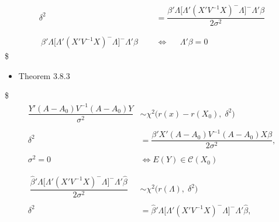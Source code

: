 \documentclass[
]{book}
\providecommand{\tightlist}{%
  \setlength{\itemsep}{0pt}\setlength{\parskip}{0pt}}
\begin{document}
{{{\begin{align}
\\
\\

\delta^2 &= \dfrac{\beta ' \Lambda \Big[ \Lambda ' (X'V^{-1}X)^- \Lambda \Big]^- \Lambda ' \beta}{2\sigma^2} \tag{1}


\\

\\

\\\


{\beta ' \Lambda \Big[ \Lambda ' (X'V^{-1}X)^- \Lambda \Big]^- \Lambda ' \beta} \; \; \; \; \; &\iff \; \; \; \; \; \Lambda ' \beta  = 0\tag{2}


\end{align}
\$

\begin{itemize}
\tightlist
\item
  Theorem 3.8.3
\end{itemize}

\$
\begin{align}

\dfrac{Y' (A-A_0) V^{-1} (A-A_0)Y}{\sigma^2} &\sim \chi^2\Big(r(x) - r(X_0), \; \delta^2 \Big)

\\
\\

\delta^2 &= \dfrac{\beta ' X' (A-A_0) V^{-1} (A-A_0)X \beta}{2\sigma^2},

\\
\\

\sigma^2 = 0 \; \; \; \; \; &\iff E(Y) \in \mathcal{C}(X_0)




\tag{1}


\\

\\

\\\

\dfrac{\hat \beta ' \Lambda \Big[ \Lambda ' (X'V^{-1}X)^- \Lambda \Big]^- \Lambda ' \hat \beta}{2\sigma^2} 

&\sim \chi^2 \Big( r(\Lambda) , \; \delta^2 \Big)


\\
\\

\delta^2 &= {\hat \beta ' \Lambda \Big[ \Lambda ' (X'V^{-1}X)^- \Lambda \Big]^- \Lambda ' \hat \beta}, 


\end{align}}}}
\end{document}
